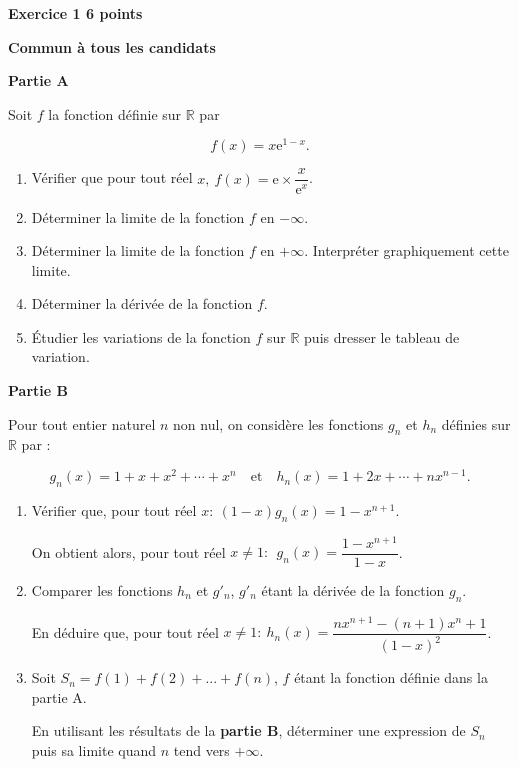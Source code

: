 \documentclass[10pt]{article}
\newcommand{\R}{\mathbb{R}}
\begin{document}
\vspace{0,25cm}

\textbf{Exercice 1 \hfill 6 points}

\textbf{Commun à tous les candidats}

\medskip
 
\textbf{Partie A}

\medskip
 
Soit $f$ la fonction définie sur $\R$ par 

\[f(x) = x \text{e}^{1-x}.\]
 
\begin{enumerate}
\item Vérifier que pour tout réel $x,\: f(x)= \text{e} \times \dfrac{x}{\text{e}^x}$. 
\item Déterminer la limite de la fonction $f$ en $- \infty$. 
\item Déterminer la limite de la fonction $f$ en $+ \infty$. Interpréter graphiquement cette limite. 
\item Déterminer la dérivée de la fonction $f$. 
\item Étudier les variations de la fonction $f$ sur $\R$ puis dresser le tableau de variation.
\end{enumerate}

\bigskip
 
\textbf{Partie B}

\medskip
 
Pour tout entier naturel $n$ non nul, on considère les fonctions $g_{n}$ et $h_{n}$ définies sur $\R$ par : 

\[g_{n}(x) = 1 + x + x^2 + \cdots + x^n \quad \text{et}\quad  h_{n}(x) = 1 + 2x + \cdots  + nx^{n-1}.\]
 
\begin{enumerate}
\item Vérifier que, pour tout réel $x :\: (1 - x)g_{n}(x) = 1 - x^{n+1}$. 

On obtient alors, pour tout réel $x \neq 1 :\:\: g_{n}(x) = \dfrac{1 - x^{n+1}}{1 - x}$. 
\item Comparer les fonctions $h_{n}$ et $g'_{n}$, $g'_{n}$ étant la dérivée de la fonction $g_{n}$. 
 	 
En déduire que, pour tout réel $x \neq 1 :\: h_{n}(x) = \dfrac{nx^{n+1} -(n+1)x^n + 1}{(1-x)^2}$.
 
\item Soit $S_{n} = f(1) + f(2) + ... + f(n)$, $f$ étant la fonction définie dans la partie A.
 
En utilisant les résultats de la \textbf{partie B}, déterminer une expression de $S_{n}$ puis sa limite quand $n$ tend vers $+ \infty$. 
\end{enumerate}
\end{document}
